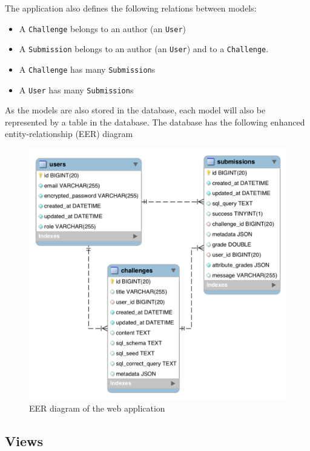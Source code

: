 The application also defines the following relations between models:
\begin{itemize}
    \item A \texttt{Challenge} belongs to an author (an \texttt{User})
    \item A \texttt{Submission} belongs to an author (an \texttt{User}) and to a \texttt{Challenge}.
    \item A \texttt{Challenge} has many \texttt{Submission}s
    \item A \texttt{User} has many \texttt{Submission}s
\end{itemize}

As the models are also stored in the database, each model will also be represented by a table in the database. The database has the following enhanced entity-relationship (EER) diagram

\begin{figure}
    \centering
    \includegraphics[width=\textwidth/8*6]{Chapters/4-Design/database_schema.png}
    \caption{EER diagram of the web application}
\end{figure}

\subsection{Views}

